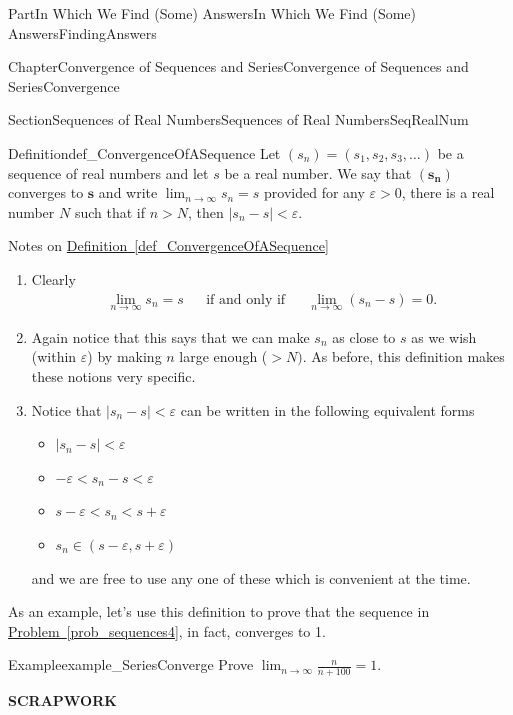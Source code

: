 \documentclass[oneside,10pt,]{book}
\newcommand{\xreffont}{\relax}
\newcommand{\terminology}[1]{\textbf{#1}}
\numberwithin{equation}{part}
\newcommand{\abs}[1]{\left|#1\right|}
\def\limit#1#2#3{{\displaystyle\lim_{#1\rightarrow #2}#3}}
\def\limitt#1#2#3{{\displaystyle\lim_{#1\rightarrow #2}\textstyle #3}}
\newcommand{\eps}{\varepsilon}
\newcommand{\lt}{<}
\newcommand{\amp}{&}
\begin{document}
\begin{partptx}{Part}{In Which We Find (Some) Answers}{}{In Which We Find (Some) Answers}{}{}{FindingAnswers}
\begin{chapterptx}{Chapter}{Convergence of Sequences and Series}{}{Convergence of Sequences and Series}{}{}{Convergence}
\begin{sectionptx}{Section}{Sequences of Real Numbers}{}{Sequences of Real Numbers}{}{}{SeqRealNum}
\begin{definition}{Definition}{}{def_ConvergenceOfASequence}%
 Let \(\left(s_n\right)=\left(s_1,s_2,s_3,\ldots\right)\) be a sequence of real numbers and let \(s\) be a real number. We say that \(\left(\boldsymbol{s}_{\boldsymbol{n}}\right)\) \textbraceleft{}converges to\textbraceright{} \(\boldsymbol{s}\) and write \(\limitt{n}{\infty}{s_n}=s\) provided for any \(\eps>0\), there is a real number \(N\) such that if \(n>N\), then \(|s_n-s|\lt \eps\).%
\end{definition}
Notes on \hyperref[def_ConvergenceOfASequence]{Definition~{\xreffont\ref{def_ConvergenceOfASequence}}}%
\begin{enumerate}
\item{}Clearly%
\begin{align*}
\limit{n}{\infty}{s_n}=s\amp{}\amp{} \text{if and only
if}\amp{}\amp{}
\limit{n}{\infty}{\left(s_n-s\right)}=0.
\end{align*}
%
\item{}Again notice that this says that we can make \(s_n\) as close to \(s\) as we wish (within \(\eps\)) by making \(n\) large enough (\(>N)\). As before, this definition makes these notions very specific.%
\item{}Notice that \(\abs{s_n-s}\lt \eps\) can be written in the following equivalent forms%
\par
%
\begin{itemize}[label=\textbullet]
\item{}\(\displaystyle \abs{s_n-s}\lt \eps\)%
\item{}\(\displaystyle -\eps\lt s_n-s\lt \eps\)%
\item{}\(\displaystyle s-\eps\lt s_n\lt s+\eps\)%
\item{}\(\displaystyle s_n\in\left(s-\eps,s+\eps\right)\)%
\end{itemize}
%
\par
and we are free to use any one of these which is convenient at the time.%
\end{enumerate}
%
\par
As an example, let's use this definition to prove that the sequence in \hyperref[prob_sequences4]{Problem~{\xreffont\ref{prob_sequences4}}}, in fact, converges to 1.%
\begin{example}{Example}{}{example_SeriesConverge}%
Prove \(\limitt{n}{\infty}{\frac{n}{n+100}}=1\).%
\par
\terminology{SCRAPWORK}%
\par

\end{example}
\end{sectionptx}
\end{chapterptx}
\end{partptx}
\end{document}
